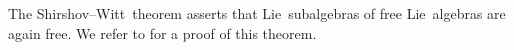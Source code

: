 \begin{remark}
	The Shirshov--Witt~theorem asserts that Lie~subalgebras of free Lie~algebras are again free.
	We refer to \cite{shirshov_subalgebras_of_free_lie_algebras} for a proof of this theorem.
\end{remark}





